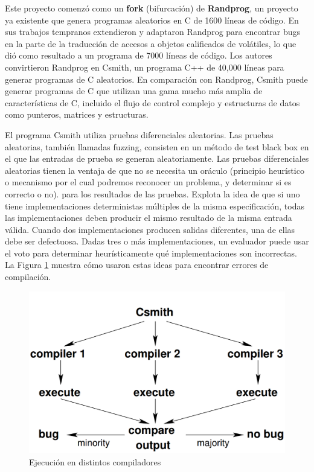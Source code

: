 Este proyecto comenzó como un \textbf{fork} (bifurcación) de \textbf{Randprog}\cite{randprog}, un proyecto ya existente que genera programas aleatorios en C de 1600 líneas de código. En sus trabajos tempranos extendieron y adaptaron Randprog para encontrar bugs en la parte de la traducción de accesos a objetos calificados de volátiles, lo que dió como resultado a un programa de 7000 líneas de código. 
Los autores convirtieron Randprog en Csmith, un programa C++ de 40,000 líneas para generar programas de C aleatorios. En comparación con Randprog, Csmith puede generar programas de C que utilizan una gama mucho más amplia de características de C, incluido el flujo de control complejo y estructuras de datos como punteros, matrices y estructuras.

El programa Csmith utiliza pruebas diferenciales aleatorias. Las pruebas aleatorias\cite{pinho2006reliable}, también llamadas fuzzing\cite{Miller:1990:ESR:96267.96279}, consisten en un método de test black box en el que las entradas de prueba se generan aleatoriamente. Las pruebas diferenciales aleatorias\cite{McKeeman98differentialtesting} tienen la ventaja de que no se necesita un oráculo (principio heurístico o mecanismo por el cual podremos reconocer un problema, y determinar si es correcto o no). para los resultados de las pruebas. Explota la idea de que si uno tiene implementaciones deterministas múltiples de la misma especificación, todas las implementaciones deben producir el mismo resultado de la misma entrada válida. Cuando dos implementaciones producen salidas diferentes, una de ellas debe ser defectuosa. Dadas tres o más implementaciones, un evaluador puede usar el voto para determinar heurísticamente qué implementaciones son incorrectas. La Figura \ref{fig:csmith compilers} muestra cómo usaron estas ideas para encontrar errores de compilación.

\begin{figure}[h]
    \centering
    \includegraphics[scale=0.3]{images/csmith1.png}
    \caption{Ejecución en distintos compiladores}
    \label{fig:csmith compilers}
\end{figure}

